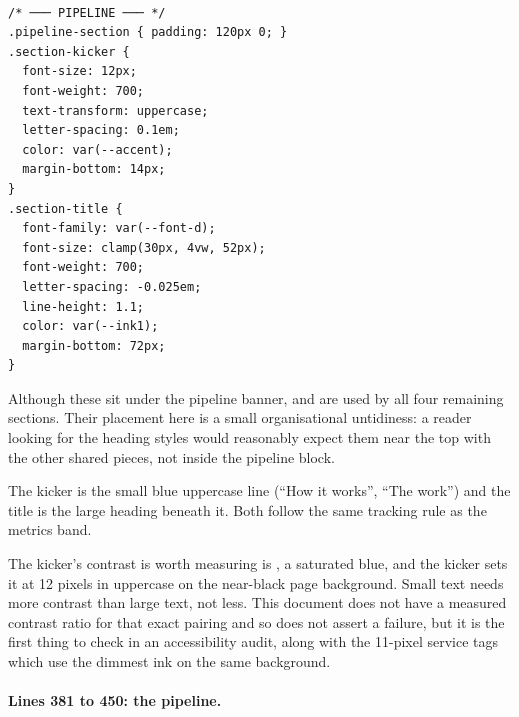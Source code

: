 \begin{lstlisting}[firstnumber=360,caption={\file{css/site.css}, lines 360--379}]

/* ─── PIPELINE ─── */
.pipeline-section { padding: 120px 0; }
.section-kicker {
  font-size: 12px;
  font-weight: 700;
  text-transform: uppercase;
  letter-spacing: 0.1em;
  color: var(--accent);
  margin-bottom: 14px;
}
.section-title {
  font-family: var(--font-d);
  font-size: clamp(30px, 4vw, 52px);
  font-weight: 700;
  letter-spacing: -0.025em;
  line-height: 1.1;
  color: var(--ink1);
  margin-bottom: 72px;
}
\end{lstlisting}

Although these sit under the pipeline banner,  and
 are used by all four remaining sections. Their placement here
is a small organisational untidiness: a reader looking for the heading styles would
reasonably expect them near the top with the other shared pieces, not inside the
pipeline block.

The kicker is the small blue uppercase line (``How it works'', ``The work'') and the
title is the large heading beneath it. Both follow the same tracking rule as the
metrics band.

\begin{honest}{The kicker's contrast is worth measuring}
 is , a saturated blue, and the kicker sets it at 12
pixels in uppercase on the near-black page background. Small text needs more
contrast than large text, not less. This document does not have a measured
contrast ratio for that exact pairing and so does not assert a failure, but it is
the first thing to check in an accessibility audit, along with the 11-pixel service
tags which use the dimmest ink on the same background.
\end{honest}

\paragraph{Lines 381 to 450: the pipeline.}

